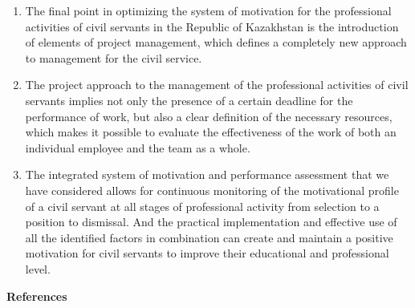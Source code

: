 \begin{enumerate}
\item
The final point in optimizing the system of motivation for the
professional activities of civil servants in the Republic of Kazakhstan
is the introduction of elements of project management, which defines a
completely new approach to management for the civil service.

\item
The project approach to the management of the professional activities
of civil servants implies not only the presence of a certain deadline
for the performance of work, but also a clear definition of the
necessary resources, which makes it possible to evaluate the
effectiveness of the work of both an individual employee and the team as
a whole.

\item
The integrated system of motivation and performance assessment that
we have considered allows for continuous monitoring of the motivational
profile of a civil servant at all stages of professional activity from
selection to a position to dismissal. And the practical implementation
and effective use of all the identified factors in combination can
create and maintain a positive motivation for civil servants to improve
their educational and professional level.
\end{enumerate}

{\bfseries References}

